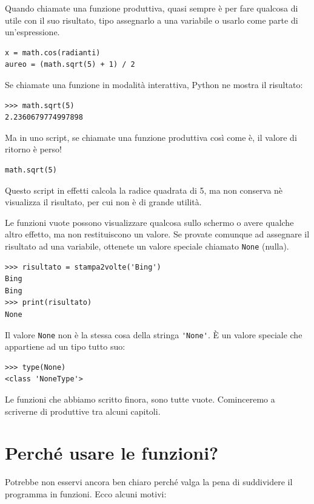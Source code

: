 \documentclass[10pt]{book}
\begin{document}
Quando chiamate una funzione produttiva, quasi sempre è per fare qualcosa di utile con il suo risultato, tipo assegnarlo a una variabile o usarlo come parte di un'espressione.

\begin{verbatim}
x = math.cos(radianti)
aureo = (math.sqrt(5) + 1) / 2
\end{verbatim}
%
Se chiamate una funzione in modalità interattiva, Python ne mostra il risultato:

\begin{verbatim}
>>> math.sqrt(5)
2.2360679774997898
\end{verbatim}
%
Ma in uno script, se chiamate una funzione produttiva così come è, il valore di ritorno è perso!

\begin{verbatim}
math.sqrt(5)
\end{verbatim}
%
Questo script in effetti calcola la radice quadrata di 5, ma non conserva nè visualizza il risultato, per cui non è di grande utilità.

Le funzioni vuote possono visualizzare qualcosa sullo schermo o avere qualche altro effetto, ma non restituiscono un valore. Se provate comunque ad assegnare il risultato ad una variabile, ottenete un valore speciale chiamato
{\tt None} (nulla).

\begin{verbatim}
>>> risultato = stampa2volte('Bing')
Bing
Bing
>>> print(risultato)
None
\end{verbatim}
%
Il valore {\tt None} non è la stessa cosa della stringa \verb"'None'". 
È un valore speciale che appartiene ad un tipo tutto suo:

\begin{verbatim}
>>> type(None)
<class 'NoneType'>
\end{verbatim}
%
Le funzioni che abbiamo scritto finora, sono tutte vuote. Cominceremo a scriverne di produttive tra alcuni capitoli.


\section{Perché usare le funzioni?}

Potrebbe non esservi ancora ben chiaro perché valga la pena di suddividere il programma in funzioni. Ecco alcuni motivi:
\end{document}
